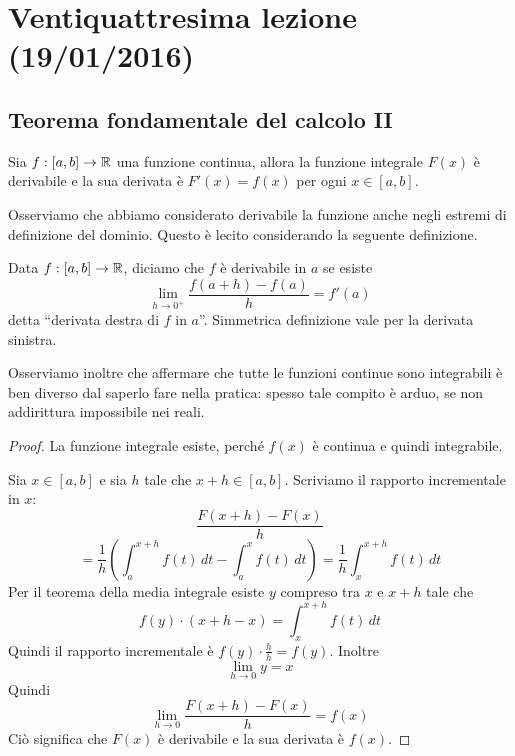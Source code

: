 \chapter{Ventiquattresima lezione (19/01/2016)}

\section{Teorema fondamentale del calcolo II}

\begin{theorem}
Sia $f:[a,b] \to \mathbb R$ una funzione continua, allora la funzione integrale $F(x)$ è derivabile e la sua derivata è $F'(x) = f(x)$ per ogni $x \in [a,b]$.
\end{theorem}

Osserviamo che abbiamo considerato derivabile la funzione anche negli estremi di definizione del dominio. Questo è lecito considerando la seguente definizione.
\begin{definition}
Data $f:[a,b] \to \mathbb R$, diciamo che $f$ è derivabile in $a$ se esiste
\begin{equation*}
\lim_{h \to 0^+} \frac{f(a+h)-f(a)}{h} = f'(a)
\end{equation*}
detta ``derivata destra di $f$ in $a$''. Simmetrica definizione vale per la derivata sinistra.
\end{definition}

Osserviamo inoltre che affermare che tutte le funzioni continue sono integrabili è ben diverso dal saperlo fare nella pratica: spesso tale compito è arduo, se non addirittura impossibile nei reali.

\begin{proof}
La funzione integrale esiste, perché $f(x)$ è continua e quindi integrabile.

Sia $x \in [a,b]$ e sia $h$ tale che $x+h \in [a,b]$. Scriviamo il rapporto incrementale in $x$:
\begin{equation*}
\frac{F(x+h)-F(x)}{h}
\end{equation*}
\begin{equation*}
= \frac{1}{h} \left( \int_a^{x+h} f(t) \, dt - \int_a^x f(t) \, dt \right) = \frac{1}{h} \int_x^{x+h} f(t) \, dt
\end{equation*}
Per il teorema della media integrale esiste $y$ compreso tra $x$ e $x+h$ tale che
\begin{equation*}
f(y) \cdot (x+h-x) = \int_x^{x+h} f(t) \, dt
\end{equation*}
Quindi il rapporto incrementale è $f(y) \cdot \frac{h}{h} = f(y)$. Inoltre
\begin{equation*}
\lim_{h \to 0} y = x
\end{equation*}
Quindi
\begin{equation*}
\lim_{h \to 0} \frac{F(x+h)-F(x)}{h} = f(x)
\end{equation*}
Ciò significa che $F(x)$ è derivabile e la sua derivata è $f(x)$.
\end{proof}

